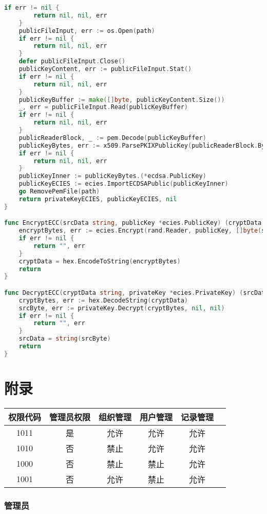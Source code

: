 \documentclass[UTF8]{ctexart}
\begin{document}
\begin{lstlisting}[language=Go]
	if err != nil {
		return nil, nil, err
	}
	publicFileInput, err := os.Open(path)
	if err != nil {
		return nil, nil, err
	}
	defer publicFileInput.Close()
	publicKeyContent, err := publicFileInput.Stat()
	if err != nil {
		return nil, nil, err
	}
	publicKeyBuffer := make([]byte, publicKeyContent.Size())
	_, err = publicFileInput.Read(publicKeyBuffer)
	if err != nil {
		return nil, nil, err
	}
	publicReaderBlock, _ := pem.Decode(publicKeyBuffer)
	publicKeyBytes, err := x509.ParsePKIXPublicKey(publicReaderBlock.Bytes)
	if err != nil {
		return nil, nil, err
	}
	publicKeyInner := publicKeyBytes.(*ecdsa.PublicKey)
	publicKeyECIES := ecies.ImportECDSAPublic(publicKeyInner)
	go RemovePemFile(path)
	return privateKeyECIES, publicKeyECIES, nil
}

func EncryptECC(srcData string, publicKey *ecies.PublicKey) (cryptData string, err error) {
	encryptBytes, err := ecies.Encrypt(rand.Reader, publicKey, []byte(srcData), nil, nil)
	if err != nil {
		return "", err
	}
	cryptData = hex.EncodeToString(encryptBytes)
	return
}

func DecryptECC(cryptData string, privateKey *ecies.PrivateKey) (srcData string, err error) {
	cryptBytes, err := hex.DecodeString(cryptData)
	srcByte, err := privateKey.Decrypt(cryptBytes, nil, nil)
	if err != nil {
		return "", err
	}
	srcData = string(srcByte)
	return
}
    \end{lstlisting}
    

    
    \newpage

    \section{附录}
    \begin{center}
        \begin{tabular}{cccccc}
            \hline
            权限代码& 管理员权限& 组织管理& 用户管理& 记录管理\\
            \hline
            1011& 是& 允许& 允许& 允许\\
            1010& 否& 禁止& 允许& 允许\\
            1000& 否& 禁止& 禁止& 允许\\
            1001& 否& 允许& 禁止& 允许\\
            \hline
        \end{tabular}
    \end{center}
    \subsubsection{管理员}
    
\end{document}
